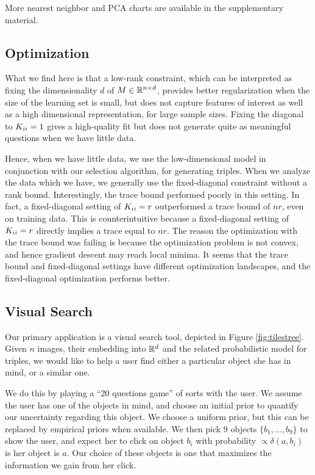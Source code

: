 \documentclass{article}
\begin{document}
More nearest neighbor and PCA charts are available in the
supplementary material.


\subsection{Optimization}


What we find here is that a low-rank constraint, which can be
interpreted as fixing the dimensionality $d$ of $M \in \reals^{n
  \times d}$, provides better regularization when the size of the
learning set is small, but does not capture features of interest as
well as a high dimensional representation, for large sample sizes.
Fixing the diagonal to $\S_{ii}=1$ gives a high-quality fit but does
not generate quite as meaningful questions when we have little data.

Hence, when we have little data, we use the low-dimensional model in
conjunction with our selection algorithm, for generating triples.
When we analyze the data which we have, we generally use the
fixed-diagonal constraint without a rank bound.  Interestingly, the
trace bound performed poorly in this setting.  In fact, a
fixed-diagonal setting of $\S_{ii}=r$ outperformed a trace bound of
$nr$, even on training data.  This is counterintuitive because a
fixed-diagonal setting of $\S_{ii}=r$ directly implies a trace equal
to $nr$.  The reason the optimization with the trace bound was failing
is because the optimization problem is not convex, and hence gradient
descent may reach local minima.  It seems that the trace bound and
fixed-diagonal settings have different optimization landscapes, and
the fixed-diagonal optimization performs better.


\subsection{Visual Search}
Our primary application is a visual search tool, depicted in Figure
\ref{fig:tilestree}. Given $n$ images, their embedding into $\reals^d$
and the related probabilistic model for triples, we would like to help
a user find either a particular object she has in mind, or a similar
one.

We do this by playing a ``20 questions game'' of sorts with the
user. We assume the user has one of the objects in mind, and choose an
initial prior to quantify our uncertainty regarding this object. We
choose a uniform prior, but this can be replaced by empirical priors
when available. We then pick 9 objects $\{b_1,\ldots,b_9\}$ to show the
user, and expect her to click on object $b_i$ with probability
$\propto \delta(a, b_i)$ is her object is $a$. Our choice of these
objects is one that maximizes the information we gain from her click.
\end{document}
